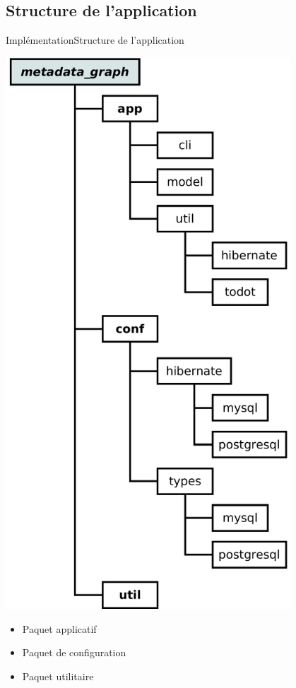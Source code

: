 \subsection{Structure de l'application}
\begin{frame}{Implémentation}{Structure de l'application}
	\begin{minipage}{0.4\textwidth}
		\includegraphics[width=0.8\textwidth]{files/archi}	
	\end{minipage}
	\begin{minipage}{0.55\textwidth}
		\begin{itemize}
		\item Paquet applicatif
		\item Paquet de configuration
		\item Paquet utilitaire
		\end{itemize}
	\end{minipage}
\end{frame}

